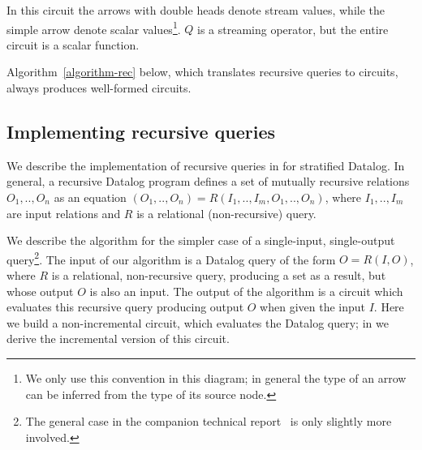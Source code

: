 In this circuit the arrows with double
heads denote stream values, while the simple arrow denote scalar values\footnote{We only use this convention in this diagram;
in general the type of an arrow can be inferred from the type
of its source node.}.  $Q$ is a streaming operator, but the entire circuit is a scalar function.

Algorithm~\ref{algorithm-rec} below, which translates recursive queries to
\dbsp circuits, always produces well-formed circuits.

\subsection{Implementing recursive queries}\label{sec:datalog}

We describe the implementation of recursive queries in \dbsp for
stratified Datalog.
In general, a recursive Datalog program defines a set of
mutually recursive relations $O_1,..,O_n$ as an equation
$(O_1,..,O_n)=R(I_1,..,I_m, O_1,..,O_n)$, where $I_1,..,I_m$ are
input relations and $R$ is a relational (non-recursive) query.

We describe the algorithm for
the simpler case of a single-input, single-output query\footnote{The general case
in the companion technical report~\cite{tr} is only
slightly more involved.}.  The input of our algorithm is a Datalog query of the form
$O = R(I, O)$, where $R$ is a relational, non-recursive query,
producing a set as a result, but whose output $O$ is also an input.
The output of the algorithm is a \dbsp circuit which evaluates this
recursive query producing output $O$ when given the input $I$.  Here we build
a non-incremental circuit, which evaluates the Datalog query;
in  we derive the incremental version
of this circuit.

